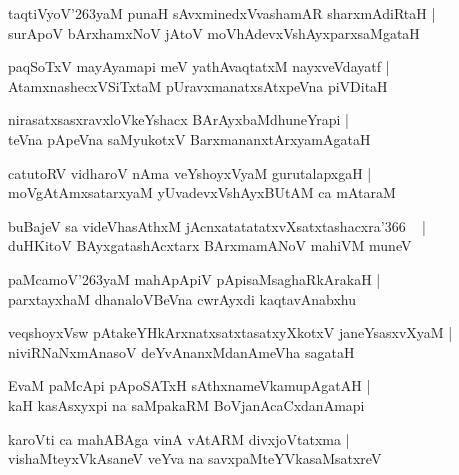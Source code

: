 \documentclass[twoside,12pt,openright]{book}
\def\S{\char'263}
\newcounter{shloka}[chapter]
\begin{document}
\begin{shloka}%
taqtiVyoV\S yaM punaH sAvxminedxVvashamAR sharxmAdiRtaH |\\
surApoV bArxhamxNoV jAtoV moVhAdevxVshAyxparxsaMgataH 
\end{shloka}

\begin{shloka}%
paqSoTxV mayAyamapi meV yathAvaqtatxM nayxveVdayatf |\\
AtamxnashecxVSiTxtaM pUravxmanatxsAtxpeVna piVDitaH
\end{shloka}

\begin{shloka}%
nirasatxsasxravxloVkeYshacx BArAyxbaMdhuneYrapi |\\
teVna pApeVna saMyukotxV BarxmananxtArxyamAgataH 
\end{shloka}

\begin{shloka}%
catutoRV vidharoV nAma veYshoyxVyaM gurutalapxgaH |\\
moVgAtAmxsatarxyaM yUvadevxVshAyxBUtAM ca mAtaraM 
\end{shloka}

\begin{shloka}%
buBajeV sa videVhasAthxM jAcnxatatatatxvXsatxtashacxra\char'366 ~ |\\
duHKitoV BAyxgatashAcxtarx BArxmamANoV mahiVM muneV 
\end{shloka}

\begin{shloka}%
paMcamoV\S yaM mahApApiV pApisaMsaghaRkArakaH |\\
parxtayxhaM dhanaloVBeVna cwrAyxdi kaqtavAnabxhu
\end{shloka}

\begin{shloka}%
veqshoyxVsw pAtakeYHkArxnatxsatxtasatxyXkotxV janeYsasxvXyaM |\\
niviRNaNxmAnasoV deYvAnanxMdanAmeVha sagataH
\end{shloka}

\begin{shloka}%
EvaM paMcApi pApoSATxH sAthxnameVkamupAgatAH |\\
kaH kasAsxyxpi na saMpakaRM BoVjanAcaCxdanAmapi
\end{shloka}

\begin{shloka}%
karoVti ca mahABAga vinA vAtARM divxjoVtatxma |\\
vishaMteyxVkAsaneV veYva na savxpaMteYVkasaMsatxreV
\end{shloka}
\end{document}

